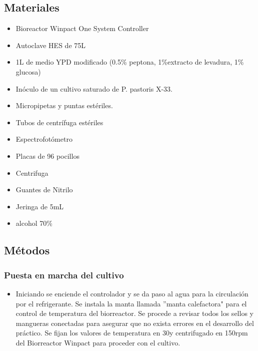 \subsection{Materiales}

\begin{multicols}{2}
  \begin{itemize}
    \item Bioreactor Winpact One System Controller
    \item Autoclave HES de 75L
    \item 1L de medio YPD modificado (0.5\% peptona, 1\%extracto de levadura, 1\% glucosa) 
    \item Inóculo de un cultivo saturado de P. pastoris X-33.
    \item Micropipetas y puntas estériles. 
    \item Tubos de centrífuga estériles
    \item Espectrofotómetro
    \item Placas de 96 pocillos
    \item Centrifuga
    \item Guantes de Nitrilo
    \item Jeringa de 5mL
    \item alcohol 70\%

  \end{itemize}
\end{multicols}

\subsection{Métodos}

\subsubsection{Puesta en marcha del cultivo}

\begin{itemize}
  \item Iniciando se enciende el controlador y se da paso al agua para la circulación por el refrigerante. Se instala la manta llamada ''manta calefactora" para el control de temperatura del biorreactor. Se procede a revisar todos los sellos y mangueras conectadas para asegurar que no exista errores en el desarrollo del práctico. Se fijan los valores de temperatura en 30\textdegree y centrifugado en 150rpm del Biorreactor Winpact para proceder con el cultivo.
\end{itemize}

